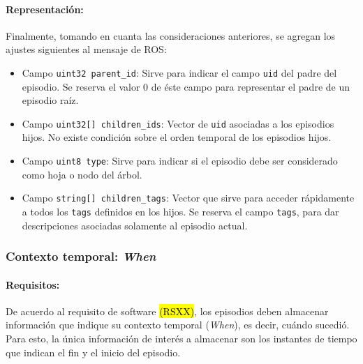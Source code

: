 \paragraph{Representación:}
Finalmente, tomando en cuanta las consideraciones anteriores, se agregan los ajustes siguientes al mensaje de ROS:
\begin{itemize}
\item Campo \texttt{uint32 parent\_id}: Sirve para indicar el campo \texttt{uid} del padre del episodio. Se reserva el valor $0$ de éste campo para representar el padre de un episodio raíz.
\item Campo \texttt{uint32[] children\_ids}: Vector de \texttt{uid} asociadas a los episodios hijos. No existe condición sobre el orden temporal de los episodios hijos.
\item Campo \texttt{uint8 type}: Sirve para indicar si el episodio debe ser considerado como hoja o nodo del árbol.
\item Campo \texttt{string[] children\_tags}: Vector que sirve para acceder rápidamente a todos los \texttt{tags} definidos en los hijos. Se reserva el campo \texttt{tags}, para dar descripciones asociadas solamente al episodio actual.
\end{itemize}
 
 
\subsubsection{Contexto temporal: \textit{When}}\label{sec:design_ep_when}

\paragraph{Requisitos:}
De acuerdo al requisito de software \hl{(RSXX)}, los episodios deben almacenar información que indique su contexto temporal (\textit{When}), es decir, cuándo  sucedió. Para esto, la única información de interés a almacenar son los instantes de tiempo que indican el fin y el inicio del episodio.

